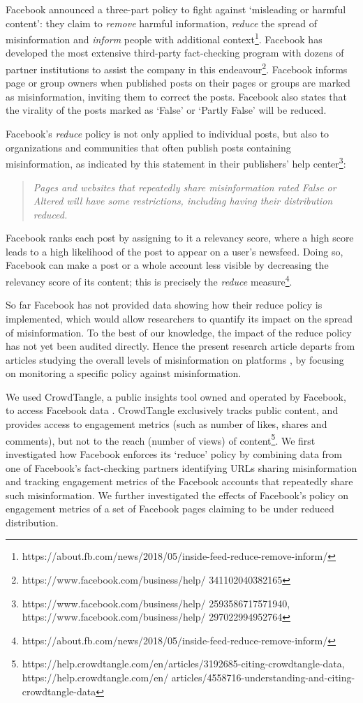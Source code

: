 \documentclass[11pt,a4paper]{article}
\begin{document}
Facebook announced a three-part policy to fight against ‘misleading or harmful content’: they claim to \textit{remove} harmful information, \textit{reduce} the spread of misinformation and \textit{inform} people with additional context\footnote{https://about.fb.com/news/2018/05/inside-feed-reduce-remove-inform/}. 
Facebook has developed the most extensive third-party fact-checking program with dozens of partner institutions to assist the company in this endeavour\footnote{https://www.facebook.com/business/help/ 341102040382165}.
Facebook informs page or group owners when published posts on their pages or groups are marked as misinformation, inviting them to correct the posts.
Facebook also states that the virality of the posts marked as `False' or `Partly False' will be reduced.

Facebook’s \textit{reduce} policy is not only applied to individual posts, but also to organizations and communities that often publish posts containing misinformation, as indicated by this statement in their publishers’ help center\footnote{https://www.facebook.com/business/help/ 2593586717571940, https://www.facebook.com/business/help/ 297022994952764}: 
\begin{quote}
\emph{Pages and websites that repeatedly share misinformation rated False or Altered will have some restrictions, including having their distribution reduced.}
\end{quote}
Facebook ranks each post by assigning to it a relevancy score, where a high score leads to a high likelihood of the post to appear on a user's newsfeed. 
Doing so, Facebook can make a post or a whole account less visible by decreasing the relevancy score of its content; this is precisely the {\it reduce} measure\footnote{https://about.fb.com/news/2018/05/inside-feed-reduce-remove-inform/}.

So far Facebook has not provided data showing how their reduce policy is implemented, which would allow researchers to quantify its impact on the spread of misinformation. 
To the best of our knowledge, the impact of the reduce policy has not yet been audited directly.
Hence the present research article departs from articles studying the overall levels of misinformation on platforms \citep{allcott2019trends, kornbluh2020new, resnick2018iffy}, by focusing on monitoring a specific policy against misinformation.

We used CrowdTangle, a public insights tool owned and operated by Facebook, to access Facebook data \citep{team2020crowdtangle}. 
CrowdTangle exclusively tracks public content, and provides access to engagement metrics (such as number of likes, shares and comments), but not to the reach (number of views) of content\footnote{https://help.crowdtangle.com/en/articles/3192685-citing-crowdtangle-data, https://help.crowdtangle.com/en/
articles/4558716-understanding-and-citing-crowdtangle-data}. 
We first investigated how Facebook enforces its ‘reduce’ policy by combining data from one of Facebook's fact-checking partners identifying URLs sharing misinformation and tracking engagement metrics of the Facebook accounts that repeatedly share such misinformation. 
We further investigated the effects of Facebook’s policy on engagement metrics of a set of Facebook pages claiming to be under reduced distribution.
\end{document}

